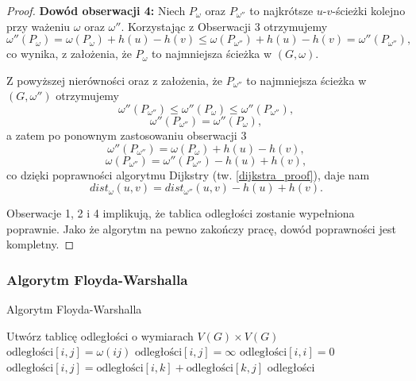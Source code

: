 \begin{theorem}
\begin{proof}
		\textbf{Dowód obserwacji 4:} Niech $P_{\omega}$ oraz 
		$P_{\omega''}$ to najkrótsze $u$-$v$-ścieżki kolejno 
		przy ważeniu $\omega$ oraz $\omega''$. Korzystając z 
		Obserwacji 3 otrzymujemy
		\[\omega''(P_{\omega}) = \omega(P_{\omega}) + h(u) - h(v) \leq
		\omega(P_{\omega''}) + h(u) - h(v) = \omega''(P_{\omega''}),\]
		co wynika, z założenia, że $P_{\omega}$ to 
		najmniejsza ścieżka w $(G, \omega)$. 
		
		Z powyższej nierówności oraz z założenia, że $P_{\omega''}$ to 
		najmniejsza ścieżka w $(G, \omega'')$ otrzymujemy
		\[\omega''(P_{\omega''}) \leq \omega''(P_{\omega}) \leq \omega''(P_{\omega''}), \]
		\[\omega''(P_{\omega''}) = \omega''(P_{\omega}),\]
		a zatem po ponownym zastosowaniu obserwacji 3
		\[\omega''(P_{\omega''}) = \omega(P_{\omega}) + h(u) - h(v),\]
		\[\omega(P_{\omega''}) = \omega''(P_{\omega''}) - h(u) + h(v),\]
		co dzięki poprawności algorytmu Dijkstry (tw. \ref{dijkstra_proof}),
		daje nam
		\[dist_{\omega}(u, v) = dist_{\omega''}(u, v) - h(u) + h(v).\]
		
		Obserwacje 1, 2 i 4 implikują, że tablica odległości zostanie
		wypełniona poprawnie. Jako że algorytm na pewno zakończy pracę,
		dowód poprawności jest kompletny.
	\end{proof} 
\end{theorem}

\subsubsection{Algorytm Floyda-Warshalla}
\begin{algorithm}[H]
	\caption{Algorytm Floyda-Warshalla}
	\begin{algorithmic}[1]
		\State Utwórz tablicę odległości o wymiarach $V(G) \times V(G)$
		\State $\text{odległości}[i, j] = \omega(ij)$
		\Else
		\State $\text{odległości}[i, j] = \infty$
		\EndIf
		\EndFor
		\EndFor
		\State $\text{odległości}[i, i] = 0$
		\EndFor
		\State $\text{odległości}[i, j] = \text{odległości}[i, k] + \text{odległości}[k, j]$
		\EndIf
		\EndFor
		\EndFor
		\EndFor
		\State \Return odległości
		\EndProcedure
	\end{algorithmic}
	\label{floydWarshall_alg}
\end{algorithm}


